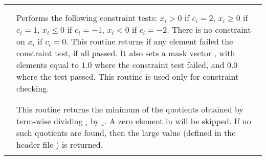\begin{supertabular}{|p{\colone}|p{\coltwo}|}
\\
&\\
 &  \\
& Performs the following constraint tests:
$x_i > 0$ if $c_i=2$,
$x_i \ge 0$ if $c_i=1$,
$x_i \le 0$ if $c_i=-1$,
$x_i < 0$ if $c_i=-2$.
There is no constraint on $x_i$ if $c_i=0$.
This routine returns  if any element failed
the constraint test,  if all passed.  It also sets a
mask vector , with elements equal to $1.0$ where the constraint 
test failed, and $0.0$ where the test passed.
This routine is used only for constraint checking.
\\
&\\
 &  \\
& This routine returns the minimum of the quotients obtained   
by term-wise dividing $_i$ by $_i$. 
A zero element in  will be skipped. 
If no such quotients are found, then the large value 
 (defined in the header file )
is returned. 
\\
&\\
\end{supertabular}
\bigskip

